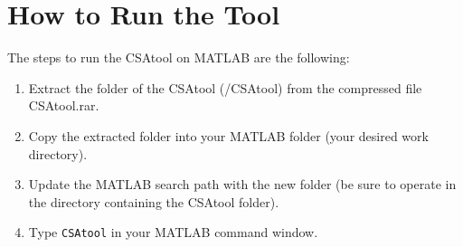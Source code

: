 \label{howtorun}

\section{How to Run the Tool}
The steps to run the CSAtool on MATLAB are the following:
\begin{enumerate}
	\item Extract the folder of the CSAtool (/CSAtool) from the compressed file CSAtool.rar.
	\item Copy the extracted folder into your MATLAB folder (your desired work directory).
	\item Update the MATLAB search path with the new folder (be sure to operate in the directory containing the CSAtool folder).
	\item Type \texttt{CSAtool} in your MATLAB command window.
\end{enumerate}
